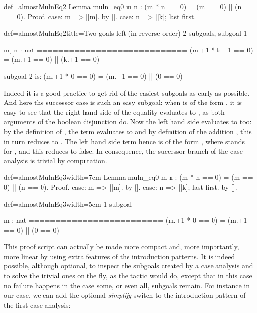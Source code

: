 \begin{coq}{def=almostMulnEq2}{}
Lemma muln_eq0 m n : (m * n == 0) = (m == 0) || (n == 0).
Proof.
case: m => [|m].
  by [].
case: n => [|k]; last first.
\end{coq}
\begin{coqout}{def=almostMulnEq2}{title=Two goals left (in reverse order)}
2 subgoals, subgoal 1

m, n : nat
============================
(m.+1 * k.+1 == 0) = (m.+1 == 0) || (k.+1 == 0)

subgoal 2 is:
 (m.+1 * 0 == 0) = (m.+1 == 0) || (0 == 0)
\end{coqout}
Indeed it is a good practice to get rid of the easiest subgoals as
early as possible. And here the successor case is such an easy
subgoal: when  is of the form , it is easy to see that the
right hand side of the equality evaluates to , as both
arguments of the boolean disjunction do. Now the left hand side
evaluates to  too: by the definition of , the term
 evaluates to  and by
definition of the addition , this in turn reduces to
. The left hand side term hence is of the form
, where  stands for , and this
reduces to false.\label{proof:mulneq0}
In consequence, the successor branch of the case analysis is trivial
by computation.


\begin{coq}{def=almostMulnEq3}{width=7cm}
Lemma muln_eq0 m n :
  (m * n == 0) = (m == 0) || (n == 0).
Proof.
case: m => [|m].
  by [].
case: n => [|k]; last first.
  by [].
\end{coq}
\begin{coqout}{def=almostMulnEq3}{width=5cm}
1 subgoal

m : nat
=========================
(m.+1 * 0 == 0) =
  (m.+1 == 0) || (0 == 0)
\end{coqout}

This proof script can actually be made more compact and, more
importantly, more linear by using extra features of the introduction
patterns. It is indeed possible, although optional, to
inspect the subgoals created by a case analysis and to solve the
trivial ones on the fly, as the  tactic would do, except that
in this case no failure happens in the case some, or even all,
subgoals remain. For instance in our case,
we can add the optional \C{//} \emph{simplify} switch to the
introduction pattern of the first case analysis:

